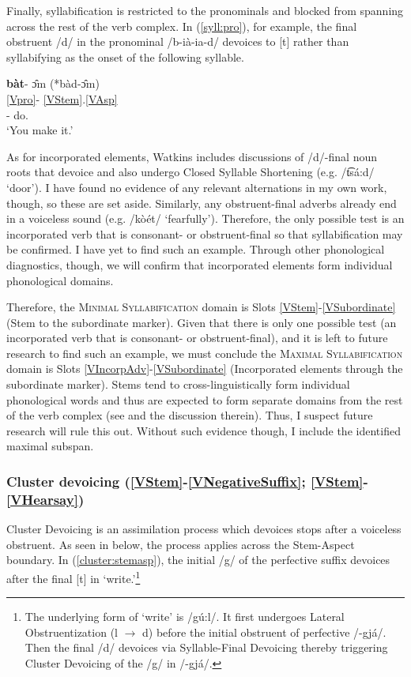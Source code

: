 \documentclass[output=paper]{langscibook}
\begin{document}
Finally, syllabification is restricted to the pronominals and blocked from spanning across the rest of the verb complex. In (\ref{syll:pro}), for example, the final obstruent /d/ in the pronominal /b-i\`a-ia-d/ devoices to [t] rather than syllabifying as the onset of the following syllable. 

\ea \label{syll:pro}
\glll \textbf{b\`at}- \^{ɔ}m (*b\`ad-\^{ɔ}m)\\
{\ref{Vpro}}- \ref{VStem}.\ref{VAsp}\\
[\Second\Sg/\Aarg:\Pl/\Obj]- do.{\Ipfv} \\
\trans `You make it.' \citep[][82]{Miller:2018}
\z 

As for incorporated elements, Watkins includes discussions of /d/-final noun roots that devoice and also undergo Closed Syllable Shortening (e.g. /t͡sá:d/ `door'). I have found no evidence of any relevant alternations in my own work, though, so these are set aside. Similarly, any obstruent-final adverbs already end in a voiceless sound (e.g. /kòét/ `fearfully'). Therefore, the only possible test is an incorporated verb that is consonant- or obstruent-final so that syllabification may be confirmed. I have yet to find such an example. Through other phonological diagnostics, though, we will confirm that incorporated elements form individual phonological domains.

Therefore, the \textsc{Minimal Syllabification} domain is Slots \ref{VStem}-\ref{VSubordinate} (Stem to the subordinate marker). Given that there is only one possible test (an incorporated verb that is consonant- or obstruent-final), and it is left to future research to find such an example, we must conclude the \textsc{Maximal Syllabification} domain is Slots \ref{VIncorpAdv}-\ref{VSubordinate} (Incorporated elements through the subordinate marker). Stems tend to cross-linguistically form individual phonological words and thus are expected to form separate domains from the rest of the verb complex (see \citealt{Miller:2018} and the discussion therein). Thus, I suspect future research will rule this out. Without such evidence though, I include the identified maximal subspan. 

\subsubsection{Cluster devoicing (\ref{VStem}-\ref{VNegativeSuffix}; \ref{VStem}-\ref{VHearsay}) } \label{sec:cluster}

Cluster Devoicing is an assimilation process which devoices stops after a voiceless obstruent. As seen in below, the process applies across the Stem-Aspect boundary. In (\ref{cluster:stemasp}), the initial /g/ of the perfective suffix devoices after the final [t] in `write.'\footnote{The underlying form of `write' is /gú:l/. It first undergoes Lateral Obstruentization (l {$\rightarrow$} d) before the initial obstruent of perfective /-gjá/. Then the final /d/ devoices via Syllable-Final Devoicing thereby triggering Cluster Devoicing of the /g/ in /-gjá/.}
\end{document}
